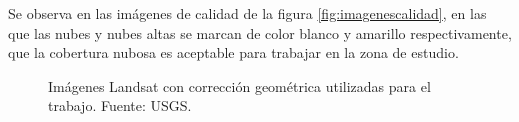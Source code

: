 Se observa en las imágenes de calidad de la figura \ref{fig:imagenescalidad}, en las que las nubes y nubes altas se marcan de color blanco y amarillo respectivamente, que la cobertura nubosa es aceptable para trabajar en la zona de estudio.%

\begin{figure}
	\centering
	\caption[Imágenes Landsat]{Imágenes Landsat con corrección geométrica utilizadas para el trabajo. Fuente: USGS.}
	\label{fig:imagenesLandsat}
\end{figure}

